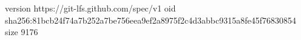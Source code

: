 version https://git-lfs.github.com/spec/v1
oid sha256:81bcb24f74a7b252a7be756eea9ef2a8975f2c4d3abbc9315a8fe45f76830854
size 9176
